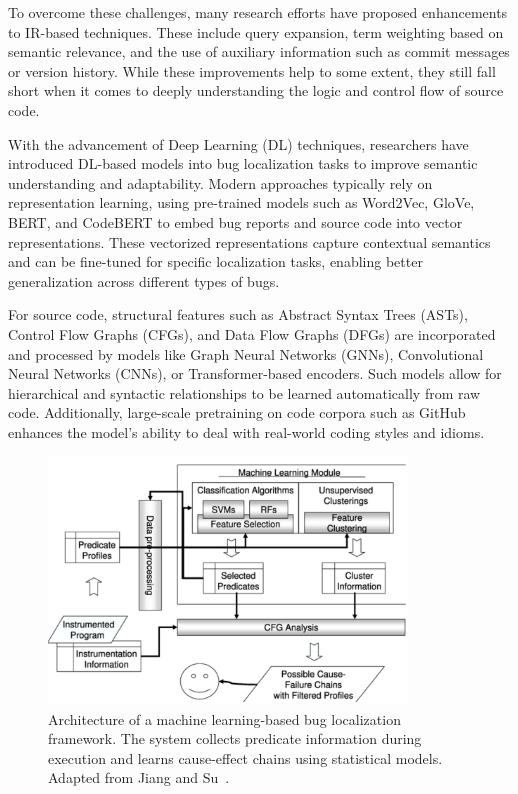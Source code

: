 \documentclass[manuscript,screen,review]{acmart}
\begin{document}
To overcome these challenges, many research efforts have proposed enhancements to IR-based techniques. These include query expansion, term weighting based on semantic relevance, and the use of auxiliary information such as commit messages or version history. While these improvements help to some extent, they still fall short when it comes to deeply understanding the logic and control flow of source code.

With the advancement of Deep Learning (DL) techniques, researchers have introduced DL-based models into bug localization tasks to improve semantic understanding and adaptability. Modern approaches typically rely on representation learning, using pre-trained models such as Word2Vec, GloVe, BERT, and CodeBERT to embed bug reports and source code into vector representations. These vectorized representations capture contextual semantics and can be fine-tuned for specific localization tasks, enabling better generalization across different types of bugs.

For source code, structural features such as Abstract Syntax Trees (ASTs), Control Flow Graphs (CFGs), and Data Flow Graphs (DFGs) are incorporated and processed by models like Graph Neural Networks (GNNs), Convolutional Neural Networks (CNNs), or Transformer-based encoders. Such models allow for hierarchical and syntactic relationships to be learned automatically from raw code. Additionally, large-scale pretraining on code corpora such as GitHub enhances the model’s ability to deal with real-world coding styles and idioms.

\begin{figure}[htbp]
  \centering
  \includegraphics[width=0.85\textwidth]{picture/5.1fig1.png}
  \caption{Architecture of a machine learning-based bug localization framework. The system collects predicate information during execution and learns cause-effect chains using statistical models. Adapted from Jiang and Su~\cite{Li2024}.}
  \label{fig:framework}
\end{figure}
\end{document}
